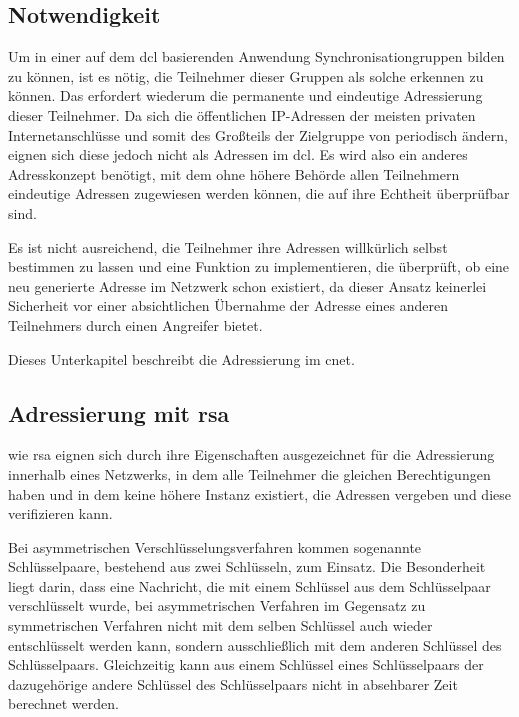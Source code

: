
\subsection{Notwendigkeit}
Um in einer auf dem \gls{dcl} basierenden Anwendung Synchronisationgruppen bilden zu können, ist es
nötig, die Teilnehmer dieser Gruppen als solche erkennen zu können.
Das erfordert wiederum die permanente und eindeutige Adressierung dieser Teilnehmer.
Da sich die öffentlichen IP-Adressen der meisten privaten Internetanschlüsse und somit des Großteils der
Zielgruppe von \sblit periodisch ändern, eignen sich diese jedoch nicht als Adressen im \gls{dcl}. Es
wird also ein anderes Adresskonzept benötigt, mit dem ohne höhere Behörde allen Teilnehmern eindeutige
Adressen zugewiesen werden können, die auf ihre Echtheit überprüfbar sind.

Es ist nicht ausreichend, die Teilnehmer ihre Adressen willkürlich selbst bestimmen zu lassen und eine
Funktion zu implementieren, die überprüft, ob eine neu generierte Adresse im Netzwerk schon existiert,
da dieser Ansatz keinerlei Sicherheit vor einer absichtlichen Übernahme der Adresse eines anderen
Teilnehmers durch einen Angreifer bietet.

Dieses Unterkapitel beschreibt die Adressierung im \gls{cnet}.


\subsection{Adressierung mit \gls*{rsa}}
 wie \gls{rsa} eignen sich durch ihre Eigenschaften
ausgezeichnet für die Adressierung innerhalb eines Netzwerks, in dem alle Teilnehmer die gleichen
Berechtigungen haben und in dem keine höhere Instanz existiert, die Adressen vergeben und diese
verifizieren kann.

Bei asymmetrischen Verschlüsselungsverfahren kommen sogenannte Schlüsselpaare, bestehend aus zwei
Schlüsseln, zum Einsatz. Die Besonderheit liegt darin, dass eine Nachricht, die mit einem Schlüssel
aus dem Schlüsselpaar verschlüsselt wurde, bei asymmetrischen Verfahren im Gegensatz zu symmetrischen
Verfahren nicht mit dem selben Schlüssel auch wieder entschlüsselt werden kann, sondern ausschließlich
mit dem anderen Schlüssel des Schlüsselpaars.
Gleichzeitig kann aus einem Schlüssel eines Schlüsselpaars der dazugehörige andere Schlüssel des
Schlüsselpaars nicht in absehbarer Zeit berechnet werden.

